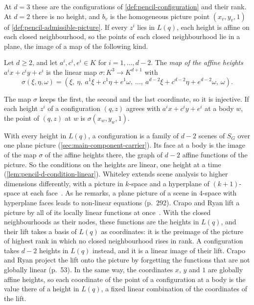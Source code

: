 At $d = 3$ these are the configurations of \cref{def:pencil-configuration}
and their rank. At $d = 2$ there is no height, and $b_v$ is the
homogeneous picture point $(x_v, y_v, 1)$ of
\cref{def:pencil-admissible-picture}. If every $z^i$ lies in $L(q)$,
each height is affine on each closed neighbourhood, so the points of
each closed neighbourhood lie in a plane, the image of a map of the
following kind.

\begin{definition}
  \label{def:pencil-d-affine-heights-map}
  \leanok
  Let $d \ge 2$, and let $a^i, c^i, e^i \in K$ for
  $i = 1, \dots, d - 2$. The \emph{map of the affine heights}
  $a^i x + c^i y + e^i$ is the linear map
  $\sigma \colon K^3 \to K^{d+1}$ with
  \[
    \sigma(\xi, \eta, \omega) = (\xi,\ \eta,\
    a^1 \xi + c^1 \eta + e^1 \omega,\ \dots,\
    a^{d-2} \xi + c^{d-2} \eta + e^{d-2} \omega,\ \omega).
  \]
\end{definition}

The map $\sigma$ keeps the first, the second and the last coordinate,
so it is injective. If each height $z^i$ of a configuration $(q, z)$
agrees with $a^i x + c^i y + e^i$ at a body $w$, the point of $(q, z)$
at $w$ is $\sigma(x_w, y_w, 1)$.

With every height in $L(q)$, a configuration is a family of $d - 2$
scenes of $S_G$ over one plane picture
(\cref{sec:main-component-carrier}). Its face at a body is the image of
the map $\sigma$ of the affine heights there, the graph of $d - 2$
affine functions of the picture. So the conditions on the heights are
linear, one height at a time (\cref{lem:pencil-d-condition-linear}).
Whiteley extends scene analysis to higher dimensions differently, with
a picture in $k$-space and a hyperplane of $(k + 1)$-space at each
face~\cite[Definition~7.2]{whiteley1984}. As he remarks, a plane
picture of a scene in $4$-space with hyperplane faces leads to
non-linear equations (p.~292). Crapo and Ryan lift a picture by all of
its locally linear functions at once~\cite[\S 8, pp.~52--53]{crapoRyan1986}.
With the closed neighbourhoods as their nodes, these functions are the
heights in $L(q)$, and their lift takes a basis of $L(q)$ as
coordinates: it is the preimage of the picture of highest rank in which
no closed neighbourhood rises in rank. A configuration takes $d - 2$
heights in $L(q)$ instead, and it is a linear image of their lift. Crapo
and Ryan project the lift onto the picture by forgetting the functions
that are not globally linear (p.~53). In the same way, the coordinates
$x$, $y$ and $1$ are globally affine heights, so each coordinate of the
point of a configuration at a body is the value there of a height in
$L(q)$, a fixed linear combination of the coordinates of the lift.

